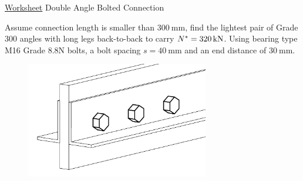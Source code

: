\begin{exmp}\href{run:./WORKSHEET/CH06/EX6.DABC.sm}{Worksheet} Double Angle Bolted Connection

Assume connection length is smaller than $\SI{300}{\mm}$, find the lightest pair of Grade 300 angles with long legs back-to-back to carry $N^*=\SI{320}{\kilo\newton}$. Using bearing type M16 Grade 8.8N bolts, a bolt spacing $s=\SI{40}{\mm}$ and an end distance of $\SI{30}{\mm}$.
\begin{figure}[H]
\includegraphics[width=8cm]{PIC/CH06/DAC}
\end{figure}
\end{exmp}
